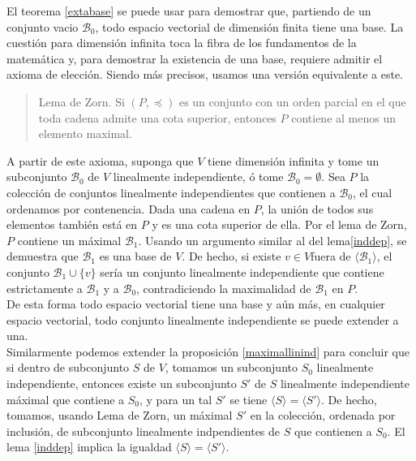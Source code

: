 \begin{obs}\label{basesinfty}
El teorema \ref{extabase} se puede usar para demostrar que, partiendo de un conjunto vacio $\mathcal{B}_0$,  todo espacio vectorial de dimensi\'on finita tiene una base. La cuesti\'on para dimensi\'on infinita toca la fibra de los fundamentos de la matem\'atica y, para demostrar la existencia de una base, requiere admitir el axioma de elecci\'on. Siendo m\'as precisos, usamos una versi\'on equivalente a este.
\begin{quote}
Lema de Zorn. Si $(P,\preccurlyeq)$ es un conjunto con un orden parcial en el que toda cadena admite una cota superior, entonces $P$ contiene al menos un elemento maximal.
\end{quote}
A partir de este axioma, suponga que $V$ tiene dimensi\'on infinita y tome un subconjunto $\mathcal{B}_0$ de $V$ linealmente independiente, \'o tome $\mathcal{B}_0=\emptyset$. Sea $P$ la colecci\'on de conjuntos linealmente independientes que contienen a $\mathcal{B}_0$, el cual ordenamos por contenencia. Dada una cadena en $P$, la uni\'on de todos sus elementos tambi\'en est\'a en $P$ y es una cota superior de ella. Por el lema de Zorn, $P$ contiene un m\'aximal $\mathcal{B}_1$. Usando un argumento similar al del lema\ref{inddep}, se demuestra que $\mathcal{B}_1$ es una base de $V$. De hecho, si existe $v\in V$fuera de $\langle \mathcal{B}_1\rangle$, el conjunto $\mathcal{B}_1\cup\{v\}$ ser\'ia un conjunto linealmente independiente que contiene estrictamente a $\mathcal{B}_1$ y a $\mathcal{B}_0$, contradiciendo la maximalidad de $\mathcal{B}_1$ en $P$.\\
De esta forma todo espacio vectorial tiene una base y a\'un m\'as, en cualquier espacio vectorial, todo conjunto linealmente independiente se puede extender a una. \\
Similarmente podemos extender la proposici\'on \ref{maximallinind} para concluir que si dentro de subconjunto $S$ de $V$, tomamos un subconjunto $S_0$ linealmente independiente, entonces existe un subconjunto $S'$ de $S$ linealmente independiente m\'aximal que contiene a $S_0$, y para un tal $S'$ se tiene $\langle S\rangle=\langle S'\rangle$. De hecho, tomamos, usando Lema de Zorn, un m\'aximal $S'$ en la colecci\'on, ordenada por inclusi\'on, de subconjunto linealmente indpendientes de $S$ que contienen a $S_0$. El lema \ref{inddep} implica la igualdad $\langle S\rangle=\langle S'\rangle$.
\end{obs}

